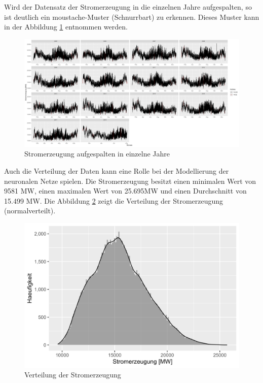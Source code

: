 \documentclass[11pt,ngerman,a4paper,]{article}
\begin{document}
Wird der Datensatz der Stromerzeugung in die einzelnen Jahre aufgespalten, so ist deutlich ein moustache-Muster (Schnurrbart) zu erkennen. Dieses Muster kann in der Abbildung \ref{fig:raw_years} entnommen werden.

\begin{figure}[H]
\centering
\includegraphics[width=1.0\textwidth]{plots/raw_years.png}
\caption{Stromerzeugung aufgespalten in einzelne Jahre}
\label{fig:raw_years}
\end{figure}

Auch die Verteilung der Daten kann eine Rolle bei der Modellierung der neuronalen Netze spielen. Die Stromerzeugung besitzt einen minimalen Wert von 9581 MW, einen maximalen Wert von 25.695MW und einen Durchschnitt von 15.499 MW. Die Abbildung \ref{fig:histogram} zeigt die Verteilung der Stromerzeugung (normalverteilt).

\begin{figure}[H]
\centering
\includegraphics[width=1.0\textwidth]{plots/histogram.png}
\caption{Verteilung der Stromerzeugung}
\label{fig:histogram}
\end{figure}
\end{document}

